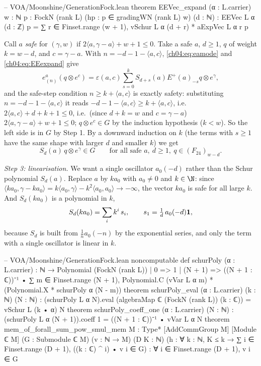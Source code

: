 \begin{leancode}
-- VOA/Moonshine/GenerationFock.lean
theorem EEVec_expand (α : L.carrier) {w : ℕ} {p : FockN (rank L)}
    (hp : p ∈ gradingWN (rank L) w) (d : ℕ) :
    EEVec L α (d : ℤ) p
      = ∑ r ∈ Finset.range (w + 1), vSchur L α (d + r) * aExpVec L α r p
\end{leancode}

Call $a$ \emph{safe} for $(\gamma,w)$ if $2\langle a,\gamma-a\rangle+w+1\le0$. Take a safe $a$, $d\ge1$, $q$
of weight $k=w-d$, and $c=\gamma-a$. With $n=-d-1-\langle a,c\rangle$, \eqref{ch04:eq:eamode} and
\eqref{ch04:eq:EEexpand} give
\begin{equation*}
  e^a_{(n)}(q\otimes e^c)=\varepsilon(a,c)\sum_{s=0}^kS_{d+s}(a)E^+(a)_{-s}q\otimes e^\gamma,
\end{equation*}
and the safe-step condition $n\ge k+\langle a,c\rangle$ is exactly safety: substituting
$n=-d-1-\langle a,c\rangle$ it reads $-d-1-\langle a,c\rangle\ge k+\langle a,c\rangle$, i.e.\
$2\langle a,c\rangle+d+k+1\le0$, i.e.\ (since $d+k=w$ and $c=\gamma-a$) $2\langle a,\gamma-a\rangle+w+1\le0$; $q\otimes e^c\in G$ by the induction hypothesis
($k<w$). So the left side is in $G$ by Step 1. By a downward induction on $k$ (the terms with $s\ge1$
have the same shape with larger $d$ and smaller $k$) we get
\begin{equation*}
  S_d(a)\,q\otimes e^\gamma\in G\qquad\text{for all safe }a,\ d\ge1,\ q\in(F_{24})_{w-d}.
\end{equation*}

\emph{Step 3: linearisation.} We want a single oscillator $a_0(-d)$ rather than the Schur
polynomial $S_d(a)$. Replace $a$ by $ka_0$ with $a_0\neq0$ and $k\in\N$: since
$\langle ka_0,\gamma-ka_0\rangle=k\langle a_0,\gamma\rangle-k^2\langle a_0,a_0\rangle\to-\infty$, the vector
$ka_0$ is safe for all large $k$. And $S_d(ka_0)$ is a polynomial in $k$,
\begin{equation*}
  S_d(ka_0)=\sum_{i}k^i\,s_i,\qquad s_1=\tfrac1d\,a_0(-d)\mathbf{1},
\end{equation*}
because $S_d$ is built from $\tfrac1n a_0(-n)$ by the exponential series, and only the term with a
single oscillator is linear in $k$.

\begin{leancode}
-- VOA/Moonshine/GenerationFock.lean
noncomputable def schurPoly (α : L.carrier) : ℕ → Polynomial (FockN (rank L))
  | 0 => 1
  | (N + 1) => ((N + 1 : ℂ))⁻¹ • ∑ m ∈ Finset.range (N + 1),
      Polynomial.C (vVar L α m) * (Polynomial.X * schurPoly α (N - m))
theorem schurPoly_eval (α : L.carrier) (k : ℕ) (N : ℕ) :
    (schurPoly L α N).eval (algebraMap ℂ (FockN (rank L)) (k : ℂ)) = vSchur L (k • α) N
theorem schurPoly_coeff_one (α : L.carrier) (N : ℕ) :
    (schurPoly L α (N + 1)).coeff 1 = ((N + 1 : ℂ))⁻¹ • vVar L α N
theorem mem_of_forall_sum_pow_smul_mem {M : Type*} [AddCommGroup M] [Module ℂ M]
    (G : Submodule ℂ M) (v : ℕ → M) (D K : ℕ)
    (h : ∀ k : ℕ, K ≤ k → ∑ i ∈ Finset.range (D + 1), ((k : ℂ) ^ i) • v i ∈ G) :
    ∀ i ∈ Finset.range (D + 1), v i ∈ G
\end{leancode}

